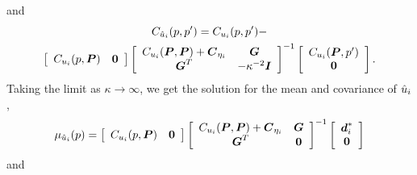 \documentclass[extra,mreferee]{gji}
\begin{document}
and
\begin{multline}\label{eq:PosteriorCov2}
C_{\post_i}(p,p') = C_{u_i}(p,p') - \\ 
                    \left[\begin{array}{cc}
                          C_{u_i}(p,\points) & \zeros \\
                          \end{array}\right]
                    \left[\begin{array}{cc}
                          C_{u_i}(\points,\points) + \mitbf{C}_{\eta_i} & \G \\
                          \G^T  & -\kappa^{-2} \eye \\
                          \end{array}\right]^{-1}
                    \left[\begin{array}{c}
                          C_{u_i}(\points,p') \\
                          \zeros \\
                          \end{array}\right].
\end{multline}
Taking the limit as $\kappa \to \infty$, we get the solution for the
mean and covariance of $\hat{u}_i$,
\begin{equation}\label{eq:PosteriorMean3}
\mu_{\post_i}(p) = \left[\begin{array}{cc}
                         C_{u_i}(p,\points) & \zeros \\
                         \end{array}\right]
                   \left[\begin{array}{cc}
                         C_{u_i}(\points,\points) + \mitbf{C}_{\eta_i} & \G \\
                         \G^T  & \zeros \\
                         \end{array}\right]^{-1}
                   \left[\begin{array}{c}
                         \data^*_i \\
                         \zeros \\
                         \end{array}\right]
\end{equation}    
and
\end{document}

